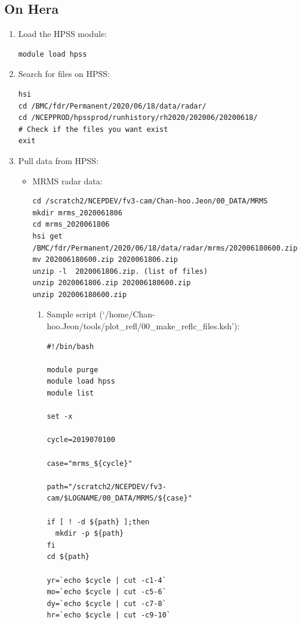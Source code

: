 \documentclass[11pt,fleqn]{report}              %
\begin{document}
\subsection{On Hera}

\begin{enumerate}
\item Load the HPSS module:
\lstset{language=bash}   
\begin{lstlisting}[frame=trBL]
module load hpss
\end{lstlisting}

\item Search for files on HPSS:
\lstset{language=bash}   
\begin{lstlisting}[frame=trBL]
hsi
cd /BMC/fdr/Permanent/2020/06/18/data/radar/
cd /NCEPPROD/hpssprod/runhistory/rh2020/202006/20200618/
# Check if the files you want exist
exit
\end{lstlisting}

\item Pull data from HPSS:
\begin{itemize}
\item MRMS radar data:
\lstset{language=bash}   
\begin{lstlisting}[frame=trBL]
cd /scratch2/NCEPDEV/fv3-cam/Chan-hoo.Jeon/00_DATA/MRMS
mkdir mrms_2020061806
cd mrms_2020061806
hsi get /BMC/fdr/Permanent/2020/06/18/data/radar/mrms/202006180600.zip
mv 202006180600.zip 2020061806.zip
unzip -l  2020061806.zip. (list of files)
unzip 2020061806.zip 202006180600.zip
unzip 202006180600.zip
\end{lstlisting}

\begin{enumerate}
\item Sample script (`/home/Chan-hoo.Jeon/tools/plot\_refl/00\_make\_reflc\_files.ksh'):
\begin{lstlisting}[frame=trBL, basicstyle=\tiny]
#!/bin/bash

module purge
module load hpss
module list

set -x

cycle=2019070100

case="mrms_${cycle}"

path="/scratch2/NCEPDEV/fv3-cam/$LOGNAME/00_DATA/MRMS/${case}"

if [ ! -d ${path} ];then
  mkdir -p ${path}
fi
cd ${path}

yr=`echo $cycle | cut -c1-4`
mo=`echo $cycle | cut -c5-6`
dy=`echo $cycle | cut -c7-8`
hr=`echo $cycle | cut -c9-10`


\end{lstlisting}
\end{enumerate}
\end{itemize}
\end{enumerate}
\end{document}
